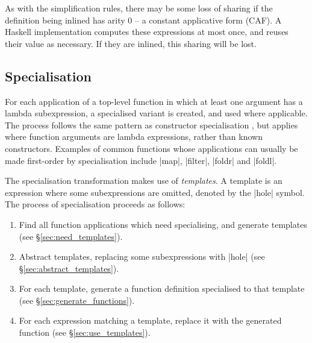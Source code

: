 \documentclass[preprint]{sigplanconf}
\begin{document}
As with the simplification rules, there may be some loss of sharing if the definition being inlined has arity 0 -- a constant applicative form (CAF). A Haskell implementation computes these expressions at most once, and reuses their value as necessary. If they are inlined, this sharing will be lost.

\subsection{Specialisation}

For each application of a top-level function in which at least one argument has a lambda subexpression, a specialised variant is created, and used where applicable. The process follows the same pattern as constructor specialisation \cite{spj:specconstr}, but applies where function arguments are lambda expressions, rather than known constructors. Examples of common functions whose applications can usually be made first-order by specialisation include |map|, |filter|, |foldr| and |foldl|.

The specialisation transformation makes use of \textit{templates}. A template is an expression where some subexpressions are omitted, denoted by the |hole| symbol. The process of specialisation proceeds as follows:

\begin{enumerate}
\item Find all function applications which need specialising, and generate templates (see \S\ref{sec:need_templates}).
\item Abstract templates, replacing some subexpressions with |hole| (see \S\ref{sec:abstract_templates}).
\item For each template, generate a function definition specialised to that template (see \S\ref{sec:generate_functions}).
\item For each expression matching a template, replace it with the generated function (see \S\ref{sec:use_templates}).
\end{enumerate}
\end{document}
